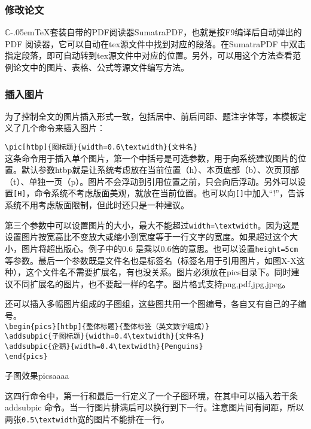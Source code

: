 \subsubsection{修改论文}
$\mathbb{C}$\kern-.05em\TeX{}套装自带的PDF阅读器SumatraPDF，也就是按F9编译后自动弹出的PDF 阅读器，它可以自动在tex源文件中找到对应的段落。在SumatraPDF 中双击指定段落，即可自动转到tex源文件中对应的位置。另外，可以用这个方法查看范例论文中的图片、表格、公式等源文件编写方法。
\subsubsection{插入图片}
为了控制全文的图片插入形式一致，包括居中、前后间距、题注字体等，本模板定义了几个命令来插入图片：

\verb|\pic[htbp]{图标题}{width=0.6\textwidth}{文件名}|\\
这条命令用于插入单个图片，第一个中括号是可选参数，用于向系统建议图片的位置。默认参数htbp就是让系统考虑放在当前位置（h）、本页底部（b）、次页顶部（t）、单独一页（p）。图片不会浮动到引用位置之前，只会向后浮动。另外可以设置\verb|[H]|，命令系统不考虑版面美观，就放在当前位置。也可以向\verb|[]|中加入“!”，告诉系统不用考虑版面限制，但此时还只是一种建议。

第三个参数中可以设置图片的大小，最大不能超过\verb|width=\textwidth|。因为这是设置图片按宽高比不变放大或缩小到宽度等于一行文字的宽度。如果超过这个大小，图片将超出版心。例子中的0.6 是乘以0.6倍的意思。也可以设置\verb|height=5cm| 等参数。最后一个参数既是文件名也是标签名（标签名用于引用图片，如图X-X这种），这个文件名不需要扩展名，有也没关系。图片必须放在pics目录下。同时建议不同扩展名的图片，也不要起一样的名字。图片格式支持png,pdf,jpg,jpeg。

还可以插入多幅图片组成的子图组，这些图共用一个图编号，各自又有自己的子编号。\\
\verb|\begin{pics}[htbp]{整体标题}{整体标签（英文数字组成）}|\\
\verb|\addsubpic{子图标题}{width=0.4\textwidth}{文件名}|\\
\verb|\addsubpic{企鹅}{width=0.4\textwidth}{Penguins}|\\
\verb|\end{pics}|\\
\begin{pics}[htbp]{子图效果}{picsaaaa}
\end{pics}
这四行命令中，第一行和最后一行定义了一个子图环境，在其中可以插入若干条addsubpic 命令。当一行图片排满后可以换行到下一行。注意图片间有间距，所以两张\verb|0.5\textwidth|宽的图片不能排在一行。\par

